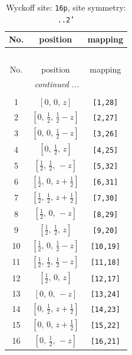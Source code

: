 \documentclass[fleqn,8pt]{jsarticle}
\begin{document}
\renewcommand{\arraystretch}{1.2}
\begin{longtable}{ccc}
\caption{Wyckoff site: {\tt 16p}, site symmetry: {\tt ..2'}}
 \\
 \hline \hline
No. & position & mapping \\ \hline \endfirsthead

\multicolumn{2}{l}{\tablename\ \thetable{}} \\
 \hline \hline
No. & position & mapping \\ \hline \endhead

 \hline \hline
\multicolumn{2}{r}{\footnotesize\it continued ...} \\ \endfoot

 \hline \hline
\multicolumn{2}{r}{} \\ \endlastfoot

1 & $\left[ 0,\, 0,\, z \right]$ & {\tt [1,28]} \\ \hline
2 & $\left[ 0,\, \frac{1}{2},\, \frac{1}{2} - z \right]$ & {\tt [2,27]} \\ \hline
3 & $\left[ 0,\, 0,\, \frac{1}{2} - z \right]$ & {\tt [3,26]} \\ \hline
4 & $\left[ 0,\, \frac{1}{2},\, z \right]$ & {\tt [4,25]} \\ \hline
5 & $\left[ \frac{1}{2},\, \frac{1}{2},\, - z \right]$ & {\tt [5,32]} \\ \hline
6 & $\left[ \frac{1}{2},\, 0,\, z + \frac{1}{2} \right]$ & {\tt [6,31]} \\ \hline
7 & $\left[ \frac{1}{2},\, \frac{1}{2},\, z + \frac{1}{2} \right]$ & {\tt [7,30]} \\ \hline
8 & $\left[ \frac{1}{2},\, 0,\, - z \right]$ & {\tt [8,29]} \\ \hline
9 & $\left[ \frac{1}{2},\, \frac{1}{2},\, z \right]$ & {\tt [9,20]} \\ \hline
10 & $\left[ \frac{1}{2},\, 0,\, \frac{1}{2} - z \right]$ & {\tt [10,19]} \\ \hline
11 & $\left[ \frac{1}{2},\, \frac{1}{2},\, \frac{1}{2} - z \right]$ & {\tt [11,18]} \\ \hline
12 & $\left[ \frac{1}{2},\, 0,\, z \right]$ & {\tt [12,17]} \\ \hline
13 & $\left[ 0,\, 0,\, - z \right]$ & {\tt [13,24]} \\ \hline
14 & $\left[ 0,\, \frac{1}{2},\, z + \frac{1}{2} \right]$ & {\tt [14,23]} \\ \hline
15 & $\left[ 0,\, 0,\, z + \frac{1}{2} \right]$ & {\tt [15,22]} \\ \hline
16 & $\left[ 0,\, \frac{1}{2},\, - z \right]$ & {\tt [16,21]} \\
\end{longtable}
\end{document}
